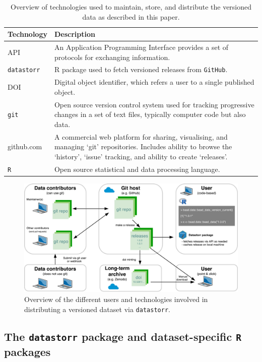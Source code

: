 \documentclass[a4paper,num-refs]{assets/oup-contemporary}
\begin{document}
\begin{table}[t!]
\centering
\caption{Overview of technologies used to maintain, store, and distribute the versioned data as described in this paper.}
\vspace{0.2cm}
  \begin{tabular}{p{3cm}p{13cm}}
  \hline
  \textbf{Technology} & \textbf{Description} \\\hline
  API & An Application Programming Interface provides a set of protocols for exchanging information.\\
   \texttt{datastorr} & R package used to fetch versioned releases from \texttt{GitHub}. \\
   DOI & Digital object identifier, which refers a user to a single published object. \\
   \texttt{git} & Open source version control system used for tracking progressive changes in a set of text files, typically computer code but also data.\\
   github.com & A commercial web platform for sharing, visualising, and managing `git' repositories. Includes ability to browse the `history', `issue' tracking, and ability to create `releases'.\\
   \texttt{R} & Open source statistical and data processing language.\\
   \hline
  \end{tabular}
\label{tab:technologies}
\end{table}

\begin{figure}[!hb]
\centering
\includegraphics[width=\linewidth]{figures/Figure2.pdf}
\caption{Overview of the different users and technologies involved in distributing a versioned dataset via \texttt{datastorr}.}
\label{fig:technology_stack}
\end{figure}


\subsection{The \texttt{datastorr} package and dataset-specific \texttt{R} packages}
\end{document}
